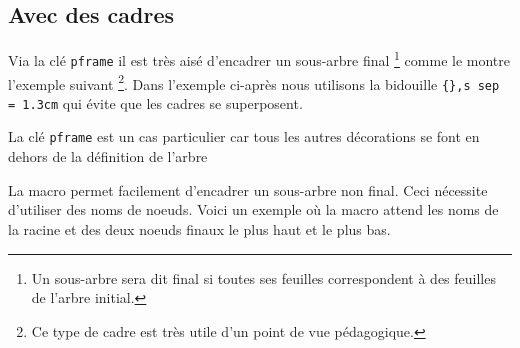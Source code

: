 \documentclass[12pt,a4paper]{article}
\begin{document}

\subsection{Avec des cadres}


Via la clé \verb#pframe# il est très aisé d'encadrer un sous-arbre final
\footnote{ 
	Un sous-arbre sera dit final si toutes ses feuilles correspondent à des feuilles de l'arbre initial. 
}
comme le montre l'exemple suivant
\footnote{ 
	Ce type de cadre est très utile d'un point de vue pédagogique. 
}.
Dans l'exemple ci-après nous utilisons la bidouille \verb+{},s sep = 1.3cm+ qui évite que les cadres se superposent.



\begin{remark}
	La clé \verb#pframe# est un cas particulier car tous les autres décorations se font en dehors de la définition de l'arbre
\end{remark}





La macro  permet facilement d'encadrer un sous-arbre non final.
Ceci nécessite d'utiliser des noms de noeuds.
Voici un exemple où la macro  attend les noms de la racine et des deux noeuds finaux le plus haut et le plus bas.

\end{document}
